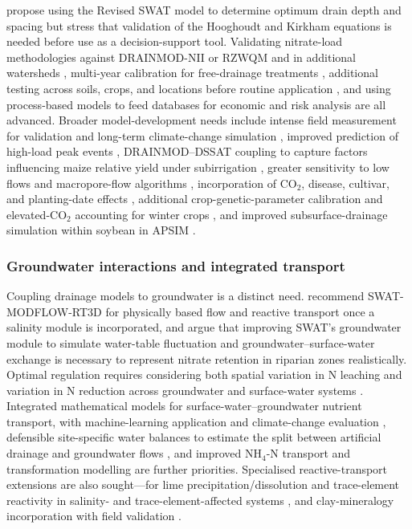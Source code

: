\documentclass[11pt]{article}
\begin{document}
\textcite{Moriasi2013} propose using the Revised SWAT model to determine optimum drain depth and spacing but stress that validation of the Hooghoudt and Kirkham equations is needed before use as a decision-support tool. Validating nitrate-load methodologies against DRAINMOD-NII or RZWQM and in additional watersheds \parencite{Ale2012}, multi-year calibration for free-drainage treatments \parencite{Ng2000}, additional testing across soils, crops, and locations before routine application \parencite{Skaggs1995}, and using process-based models to feed databases for economic and risk analysis \parencite{Malone2007} are all advanced. Broader model-development needs include intense field measurement for validation and long-term climate-change simulation \parencite{Negm2014}, improved prediction of high-load peak events \parencite{Grewal2025}, DRAINMOD--DSSAT coupling to capture factors influencing maize relative yield under subirrigation \parencite{Gunn2018}, greater sensitivity to low flows and macropore-flow algorithms \parencite{Morrison2014}, incorporation of CO$_2$, disease, cultivar, and planting-date effects \parencite{Ndulue2024}, additional crop-genetic-parameter calibration and elevated-CO$_2$ accounting for winter crops \parencite{Li2025}, and improved subsurface-drainage simulation within soybean in APSIM \parencite{Dietzel2016}.

\subsubsection{Groundwater interactions and integrated transport}

Coupling drainage models to groundwater is a distinct need. \textcite{Addab2022} recommend SWAT-MODFLOW-RT3D for physically based flow and reactive transport once a salinity module is incorporated, and \textcite{Hoang2017} argue that improving SWAT's groundwater module to simulate water-table fluctuation and groundwater--surface-water exchange is necessary to represent nitrate retention in riparian zones realistically. Optimal regulation requires considering both spatial variation in N leaching and variation in N reduction across groundwater and surface-water systems \parencite{Hojberg2017}. Integrated mathematical models for surface-water--groundwater nutrient transport, with machine-learning application and climate-change evaluation \parencite{Elsayed2023}, defensible site-specific water balances to estimate the split between artificial drainage and groundwater flows \parencite{Barkle2021}, and improved NH$_4$-N transport and transformation modelling \parencite{Yang2008} are further priorities. Specialised reactive-transport extensions are also sought---for lime precipitation/dissolution and trace-element reactivity in salinity- and trace-element-affected systems \parencite{KARAJEH1994c}, and clay-mineralogy incorporation with field validation \parencite{Dadfar2010}.
\end{document}
